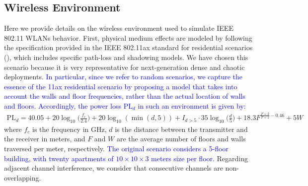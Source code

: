 \documentclass[preprint,12pt]{elsarticle}
\begin{document}
\begin{appendices}
\section{Wireless Environment}
\label{section:simulated_wireless_environment}	
Here we provide details on the wireless environment used to simulate IEEE 802.11 WLANs behavior. First, physical medium effects are modeled by following the specification provided in the IEEE 802.11ax standard for residential scenarios (\citealp{merlin2015tgax}), which includes specific path-loss and shadowing models. We have chosen this scenario because it is very representative for next-generation dense and chaotic deployments. \textcolor{blue}{In particular, since we refer to random scenarios, we capture the essence of the 11ax residential scenario by proposing a model that takes into account the walls and floor frequencies, rather than the actual location of walls and floors. Accordingly, the power loss $\text{PL}_d$ in such an environment is given by:}	
\begin{align}
	\text{PL}_d = 40.05 + 20 \log_{10}\Big(\frac{f_c}{2.4}\Big) + 20 \log_{10}(\min(d,5)) + \nonumber I_{d>5} \cdot 35\log_{10}\Big(\frac{d}{5}\Big) + 18.3 F^{\frac{F+2}{F+1}-0.46} + 5W
	\nonumber
\end{align}	
where $f_c$ is the frequency in GHz, $d$ is the distance between the transmitter and the receiver in meters, and $F$ and $W$ are the average number of floors and walls traversed per meter, respectively. \textcolor{blue}{The original scenario considers a 5-floor building, with twenty apartments of $10\times10\times3$ meters size per floor.} Regarding adjacent channel interference, we consider that consecutive channels are non-overlapping. 


\end{appendices}
\end{document}
